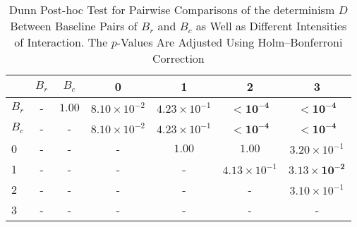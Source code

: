 \begin{table*}[!t]
\caption{Dunn Post-hoc Test for Pairwise Comparisons of the determinism $D$ Between Baseline Pairs of $B_r$ and $B_c$ as Well as Different Intensities of Interaction. The $p$-Values Are Adjusted Using Holm--Bonferroni Correction\label{tab:dunn_determinism}}
\centering
\begin{tabular}{lcccccc}
\toprule
 & $B_r$ & $B_c$ & 0 & 1 & 2 & 3 \\
\midrule
$B_r$ & - & $1.00$ & $8.10 \times 10^{-2}$ & $4.23 \times 10^{-1}$ & $\mathbf{< 10^{-4}}$ & $\mathbf{< 10^{-4}}$ \\
$B_c$ & - & - & $8.10 \times 10^{-2}$ & $4.23 \times 10^{-1}$ & $\mathbf{< 10^{-4}}$ & $\mathbf{< 10^{-4}}$ \\
0 & - & - & - & $1.00$ & $1.00$ & $3.20 \times 10^{-1}$ \\
1 & - & - & - & - & $4.13 \times 10^{-1}$ & $\mathbf{3.13 \times 10^{-2}}$ \\
2 & - & - & - & - & - & $3.10 \times 10^{-1}$ \\
3 & - & - & - & - & - & - \\
\bottomrule
\end{tabular}
\end{table*}

